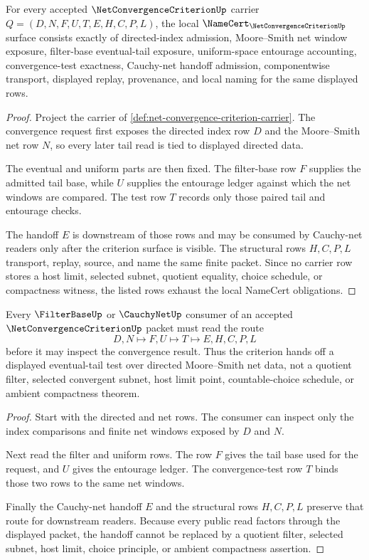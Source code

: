 \begin{theorem}
\label{thm:net-convergence-criterion-namecert-obligations}
For every accepted $\NetConvergenceCriterionUp$ carrier $Q=(D,N,F,U,T,E,H,C,P,L)$, the local $\NameCert_{\NetConvergenceCriterionUp}$ surface consists exactly of directed-index admission, Moore--Smith net window exposure, filter-base eventual-tail exposure, uniform-space entourage accounting, convergence-test exactness, Cauchy-net handoff admission, componentwise transport, displayed replay, provenance, and local naming for the same displayed rows.
\end{theorem}
\begin{proof}
Project the carrier of \autoref{def:net-convergence-criterion-carrier}. The convergence request first exposes the directed index row $D$ and the Moore--Smith net row $N$, so every later tail read is tied to displayed directed data.

The eventual and uniform parts are then fixed. The filter-base row $F$ supplies the admitted tail base, while $U$ supplies the entourage ledger against which the net windows are compared. The test row $T$ records only those paired tail and entourage checks.

The handoff $E$ is downstream of those rows and may be consumed by Cauchy-net readers only after the criterion surface is visible. The structural rows $H,C,P,L$ transport, replay, source, and name the same finite packet. Since no carrier row stores a host limit, selected subnet, quotient equality, choice schedule, or compactness witness, the listed rows exhaust the local NameCert obligations.
\end{proof}

\begin{theorem}
\label{thm:net-convergence-criterion-filter-handoff}
Every $\FilterBaseUp$ or $\CauchyNetUp$ consumer of an accepted $\NetConvergenceCriterionUp$ packet must read the route
$$
D,N \longmapsto F,U \longmapsto T \longmapsto E,H,C,P,L
$$
before it may inspect the convergence result. Thus the criterion hands off a displayed eventual-tail test over directed Moore--Smith net data, not a quotient filter, selected convergent subnet, host limit point, countable-choice schedule, or ambient compactness theorem.
\end{theorem}
\begin{proof}
Start with the directed and net rows. The consumer can inspect only the index comparisons and finite net windows exposed by $D$ and $N$.

Next read the filter and uniform rows. The row $F$ gives the tail base used for the request, and $U$ gives the entourage ledger. The convergence-test row $T$ binds those two rows to the same net windows.

Finally the Cauchy-net handoff $E$ and the structural rows $H,C,P,L$ preserve that route for downstream readers. Because every public read factors through the displayed packet, the handoff cannot be replaced by a quotient filter, selected subnet, host limit, choice principle, or ambient compactness assertion.
\end{proof}

